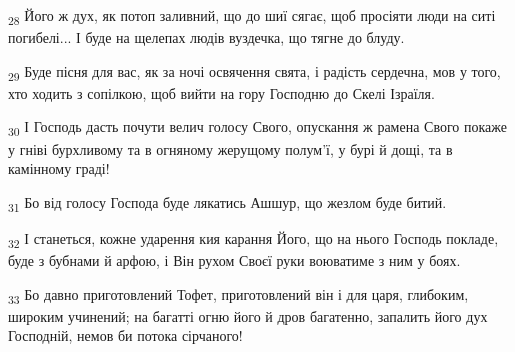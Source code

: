 \begin{tcolorbox}
\textsubscript{28} Його ж дух, як потоп заливний, що до шиї сягає, щоб просіяти люди на ситі погибелі... І буде на щелепах людів вуздечка, що тягне до блуду.
\end{tcolorbox}
\begin{tcolorbox}
\textsubscript{29} Буде пісня для вас, як за ночі освячення свята, і радість сердечна, мов у того, хто ходить з сопілкою, щоб вийти на гору Господню до Скелі Ізраїля.
\end{tcolorbox}
\begin{tcolorbox}
\textsubscript{30} І Господь дасть почути велич голосу Свого, опускання ж рамена Свого покаже у гніві бурхливому та в огняному жерущому полум'ї, у бурі й дощі, та в камінному граді!
\end{tcolorbox}
\begin{tcolorbox}
\textsubscript{31} Бо від голосу Господа буде лякатись Ашшур, що жезлом буде битий.
\end{tcolorbox}
\begin{tcolorbox}
\textsubscript{32} І станеться, кожне ударення кия карання Його, що на нього Господь покладе, буде з бубнами й арфою, і Він рухом Своєї руки воюватиме з ним у боях.
\end{tcolorbox}
\begin{tcolorbox}
\textsubscript{33} Бо давно приготовлений Тофет, приготовлений він і для царя, глибоким, широким учинений; на багатті огню його й дров багатенно, запалить його дух Господній, немов би потока сірчаного!
\end{tcolorbox}
